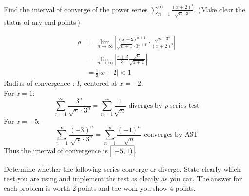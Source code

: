 \documentclass[12pt,answers]{exam}
\begin{document}
\begin{questions}
\question[12]
Find the interval of converge of the power series $\displaystyle \sum_{n=1}^\infty \frac{(x+2)^n}{\sqrt n \cdot 3^n}$.
(Make clear the status of any end points.)
\begin{solution}
    \begin{align*}
        \rho &= \lim_{n\to\infty} \left| \frac{(x+2)^{n+1}}{\sqrt{n+1} \cdot 3^{n+1}} \cdot \frac{\sqrt n \cdot 3^n}{(x+2)^n} \right| \\ 
        &= \lim_{n\to\infty} \left| \frac{x+2}{3} \frac{\sqrt{n}}{\sqrt{n+1}} \right| \\
        &= \frac13 |x+2| < 1
    \end{align*}
    Radius of convergence : 3, centered at $x = -2$. 
    \\
    For $x = 1$: 
    \[
        \sum_{n=1}^\infty \frac{3^n}{\sqrt n \cdot 3^n}
        = 
        \sum_{n=1}^\infty \frac{1}{\sqrt n } \text{ diverges by $p$-series test}
    \]
    For $x = -5$:
    \[
        \sum_{n=1}^\infty \frac{(-3)^n}{\sqrt n \cdot 3^n}
        = 
        \sum_{n=1}^\infty \frac{(-1)^n}{\sqrt n} \text{ converges by AST}
    \]
    Thus the interval of convergence is $\boxed{\intco{-5, 1}}$.
\end{solution}

\newpage
\question
Determine whether the following series converge or diverge.
State clearly which test you are using and implement the test as clearly as you can.
The answer for each problem is worth 2 points and the work you show 4 points.
\end{questions}
\end{document}
